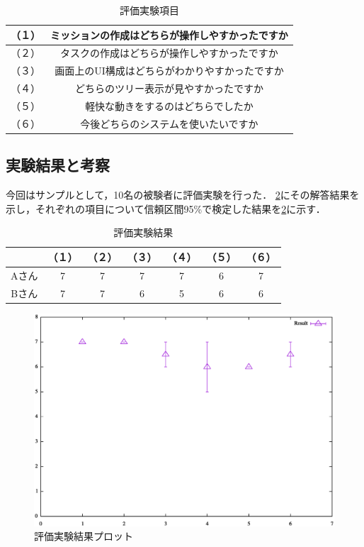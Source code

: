 \begin{table}[t]
 \caption{評価実験項目}
 \begin{center}
	 \begin{tabular}{ | c | c | } \hline
		（１） & ミッションの作成はどちらが操作しやすかったですか \\ \hline
 		（２） & タスクの作成はどちらが操作しやすかったですか \\ \hline
 		（３） & 画面上のUI構成はどちらがわかりやすかったですか \\ \hline
 		（４） & どちらのツリー表示が見やすかったですか \\ \hline
 		（５） & 軽快な動きをするのはどちらでしたか \\ \hline
 		（６） & 今後どちらのシステムを使いたいですか \\ \hline
	 \end{tabular}
	 \label{table:experiment_question}
 \end{center}
\end{table}

\subsection{実験結果と考察}
今回はサンプルとして，10名の被験者に評価実験を行った．
\ref{table:experiment_result}にその解答結果を示し，それぞれの項目について信頼区間95\%で検定した結果を\ref{table:experiment_result}に示す．

\begin{table}[t]
 \caption{評価実験結果}
 \begin{center}
	 \begin{tabular}{ | c || c | c | c | c | c | c | } \hline
		  & （１） & （２） & （３） & （４） & （５） & （６） \\ \hline \hline
			Aさん & 7 & 7 & 7 & 7 & 6 & 7 \\ \hline
			Bさん & 7 & 7 & 6 & 5 & 6 & 6 \\ \hline
	 \end{tabular}
	 \label{table:experiment_result}
 \end{center}
\end{table}

\begin{figure}[t]
	\begin{center}
		\includegraphics[width=0.9\linewidth]{assets/eps/experiment_result.eps}
		\caption{評価実験結果プロット}
		\label{graph:experiment_result}
	\end{center}
\end{figure}
